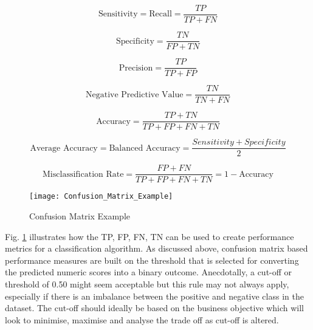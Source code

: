 \begin{equation} \label{eq:Sensitivity}
\text{Sensitivity} = \text{Recall} = \frac{TP}{TP + FN}
\end{equation}

\begin{equation} \label{eq:Specificity}
\text{Specificity} = \frac{TN}{FP + TN}
\end{equation}

\begin{equation} \label{eq:precision}
\text{Precision} = \frac{TP}{TP + FP}
\end{equation}

\begin{equation} \label{eq:npv}
\text{Negative Predictive Value} = \frac{TN}{TN + FN}
\end{equation}

\begin{equation} \label{eq:Accuracy}
\text{Accuracy} = \frac{TP + TN}{TP + FP + FN + TN}
\end{equation}

\begin{equation} \label{eq:Balanaced Accuracy}
\text{Average Accuracy} = \text{Balanced Accuracy} = \frac{Sensitivity + Specificity}{2}
\end{equation}

\begin{equation} \label{eq:Misclassification Rate}
\text{Misclassification Rate} =  \frac{FP + FN}{TP + FP + FN + TN} = 1 - \text{Accuracy}
\end{equation}

\begin{figure}[H]
	\texttt{[image: Confusion\_Matrix\_Example]}
	\caption[Confusion Matrix Example]
	{Confusion Matrix Example}
	\label{fig:ConfusionMatrixExample}
\end{figure}

Fig. \ref{fig:ConfusionMatrixExample} illustrates how the TP, FP, FN, TN can be used to create performance metrics for a classification algorithm. As discussed above, confusion matrix based performance measures are built on the threshold that is selected for converting the predicted numeric scores into a binary outcome. Anecdotally, a cut-off or threshold of 0.50 might seem acceptable but this rule may not always apply, especially if there is an imbalance between the positive and negative class in the dataset. The cut-off should ideally be based on the business objective which will look to minimise, maximise and analyse the trade off as cut-off is altered. 

